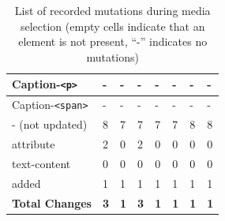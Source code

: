\documentclass[a4paper, 10pt]{article}
\begin{document}
\begin{table}[!ht]
\begin{adjustbox}{angle=90}
\begin{tabular}{|l|l|l|l|l|l|l|l|}
      Caption-\verb|<p>|              & -                 & -               & -                   & -             & -               & -               & -               \\ \hline
      Caption-\verb|<span>|           & -                 & -               & -                   & -             & -               & -               & -               \\ \hline
      \hline
      - (not updated)                 & 8                 & 7               & 7                   & 7             & 7               & 8               & 8               \\ \hline
      \hline
      attribute                       & 2                 & 0               & 2                   & 0             & 0               & 0               & 0               \\ \hline
      text-content                    & 0                 & 0               & 0                   & 0             & 0               & 0               & 0               \\ \hline
      added                           & 1                 & 1               & 1                   & 1             & 1               & 1               & 1               \\ \hline\hline
      \textbf{Total Changes}          & \textbf{3}        & \textbf{1}      & \textbf{3}          & \textbf{1}    & \textbf{1}      & \textbf{1}      & \textbf{1}      \\ \hline
    \end{tabular}
  \end{adjustbox}
  \caption{List of recorded mutations during media selection (empty cells indicate that an element is not present, \enquote{-} indicates no mutations)}
  \label{tab:mutations:mediaSelection}
\end{table}
\end{document}
